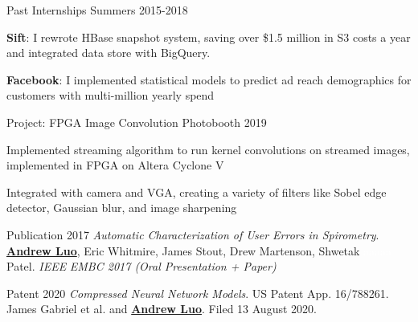 
\begin{cventries}
  \vspace{-0.5em}
  \cventry
    {Past Internships}
    {}
    {}
    {Summers 2015-2018}
    {
      \begin{cvitems}
        \item {\textbf{Sift}: I rewrote HBase snapshot system, {saving over \$1.5 million in S3 costs a year} and integrated data store with BigQuery.}
		\item {\textbf{Facebook}: I implemented statistical models to predict ad reach demographics for customers with multi-million yearly spend}
      \end{cvitems}
    }
  \vspace{-0.5em}
\end{cventries}

\begin{cventries}
  \vspace{-0.5em}
  \cventry
    {Project: FPGA Image Convolution Photobooth}
    {}
    {}
    {2019}
    {
    \begin{cvitems}
	\item {Implemented streaming algorithm to run kernel convolutions on streamed images, implemented in FPGA on Altera Cyclone V}
    \item {Integrated with camera and VGA, creating a variety of filters like Sobel edge detector, Gaussian blur, and image sharpening}
    \end{cvitems}
    }
  \vspace{-0.5em}
\end{cventries}

\begin{cventries}
  \vspace{-0.5em}
  \cventry
    {Publication}
    {}
    {}
    {2017}
    {
    \textit{Automatic Characterization of User Errors in Spirometry}. \underline{\textbf{Andrew Luo}}, Eric Whitmire,
 James Stout, Drew Martenson, Shwetak \textcolor{white}{aaaaa} Patel. \textit{IEEE} \textit{EMBC 2017 (Oral Presentation + Paper)}}
  \vspace{-0.17em}
\end{cventries}

\begin{cventries}
  \vspace{-0.17em}
  \cventry
    {Patent}
    {}
    {}
    {2020}
    {
    \textit{Compressed Neural Network Models}. US Patent App. 16/788261. James Gabriel et al. and \underline{\textbf{Andrew Luo}}. Filed 13 August 2020.}
  \vspace{-0.5em}
\end{cventries}